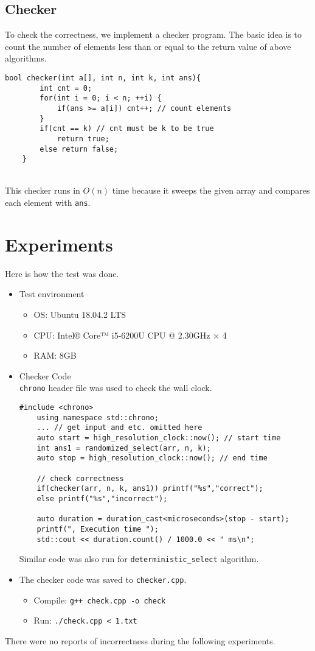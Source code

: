 \documentclass[12pt]{article}
\begin{document}
\subsection{Checker}
To check the correctness, we implement a checker program. The basic idea is to count the number of elements less than or equal to the return value of above algorithms.
\begin{lstlisting}[style=Cstyle]
	bool checker(int a[], int n, int k, int ans){
		int cnt = 0;
		for(int i = 0; i < n; ++i) {
			if(ans >= a[i]) cnt++; // count elements
		}
		if(cnt == k) // cnt must be k to be true
			return true;
		else return false;
	}
\end{lstlisting}~\\
This checker runs in $O(n)$ time because it sweeps the given array and compares each element with \texttt{ans}.

\section{Experiments}
Here is how the test was done.
\begin{itemize}
	\item Test environment
	\begin{itemize}
		\item OS: Ubuntu 18.04.2 LTS
		\item CPU: Intel® Core™ i5-6200U CPU @ 2.30GHz $\times$ 4
		\item RAM: 8GB  
	\end{itemize} 
	\item Checker Code\\
	\texttt{chrono} header file was used to check the wall clock.
	\begin{lstlisting}[style=Cstyle]
	#include <chrono>
	using namespace std::chrono;
	... // get input and etc. omitted here
	auto start = high_resolution_clock::now(); // start time
	int ans1 = randomized_select(arr, n, k);
	auto stop = high_resolution_clock::now(); // end time
	
	// check correctness
	if(checker(arr, n, k, ans1)) printf("%s","correct");
	else printf("%s","incorrect");
	
	auto duration = duration_cast<microseconds>(stop - start);
	printf(", Execution time ");
	std::cout << duration.count() / 1000.0 << " ms\n";
\end{lstlisting}
	Similar code was also run for \texttt{deterministic\_select} algorithm.
	\item The checker code was saved to \texttt{checker.cpp}.
	\begin{itemize}
		\item Compile: \texttt{g++ check.cpp -o check}
		\item Run: \texttt{./check.cpp < 1.txt}
	\end{itemize}
\end{itemize}
There were no reports of incorrectness during the following experiments.
\end{document}
